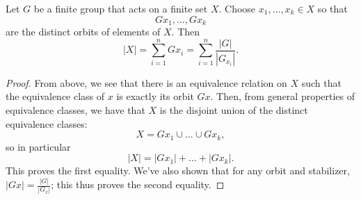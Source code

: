 \documentclass[math1530-lecture-notes]{subfiles}
\begin{document}
\begin{theorem}{}
  Let $G$ be a finite group that acts on a finite set $X$. Choose $x_1,\ldots,x_k\in X$ so that \[
    Gx_1,\ldots,Gx_k
  \] are the distinct orbits of elements of $X$. Then \[
    \left| X \right| =\sum_{i=1}^{n} Gx_i=\sum_{i=1}^{n} \frac{\left| G \right| }{\left| G_{x_i} \right| }
  .\] 
\end{theorem}
\begin{proof}[Proof]
  From above, we see that there is an equivalence relation on $X$ such that the equivalence class of
  $x$ is exactly its orbit $Gx$. Then, from general properties of equivalence classes, we have that
  $X$ is the disjoint union of the distinct equivalence classes: \[
    X=Gx_1\cup \ldots\cup Gx_k
  ,\] so in particular \[
    \left| X \right| =\left| Gx_1 \right| +\ldots+\left| Gx_k \right| 
  .\] This proves the first equality. We've also shown that for any orbit and stabilizer, $\left| Gx
  \right| =\frac{\left| G \right| }{\left| G_x \right| }$; this thus proves the second equality.
\end{proof}
\end{document}
